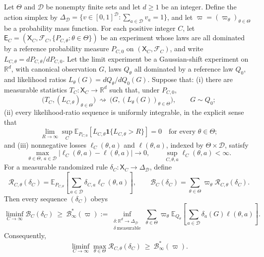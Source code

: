 Let \(\Theta\) and \(\mathcal D\) be nonempty finite sets and let \(d\geq1\) be an integer.  Define the action simplex by \(\Delta_{\mathcal D}=\{v\in[0,1]^{\mathcal D}:\sum_{a\in\mathcal D}v_a=1\}\), and let \(\varpi=(\varpi_\theta)_{\theta\in\Theta}\) be a probability mass function.  For each positive integer \(C\), let \(\mathsf E_C=(\mathsf X_C,\mathcal F_C,\{P_{C,\theta}:\theta\in\Theta\})\) be an experiment whose laws are all dominated by a reference probability measure \(P_{C,0}\) on \((\mathsf X_C,\mathcal F_C)\), and write \(L_{C,\theta}=dP_{C,\theta}/dP_{C,0}\).  Let the limit experiment be a Gaussian-shift experiment on \(\mathbb R^d\), with canonical observation \(G\), laws \(Q_\theta\) all dominated by a reference law \(Q_0\), and likelihood ratios \(L_\theta(G)=dQ_\theta/dQ_0(G)\).  Suppose that: (i) there are measurable statistics \(T_C\colon\mathsf X_C\to\mathbb R^d\) such that, under \(P_{C,0}\),
\[
 \bigl(T_C,(L_{C,\theta})_{\theta\in\Theta}\bigr)
 \ \rightsquigarrow\ 
 \bigl(G,(L_\theta(G))_{\theta\in\Theta}\bigr),
 \qquad G\sim Q_0;
\]
(ii) every likelihood-ratio sequence is uniformly integrable, in the explicit sense that
\[
 \lim_{R\to\infty}\sup_C
 \mathbb E_{P_{C,0}}\!\left[L_{C,\theta}
 \mathbf 1\{L_{C,\theta}>R\}\right]=0
 \quad\text{for every }\theta\in\Theta;
\]
and (iii) nonnegative losses \(\ell_C(\theta,a)\) and \(\ell(\theta,a)\), indexed by \(\Theta\times\mathcal D\), satisfy
\[
 \max_{\theta\in\Theta,\ a\in\mathcal D}
 |\ell_C(\theta,a)-\ell(\theta,a)|\longrightarrow0,
 \qquad
 \sup_{C,\theta,a}\ell_C(\theta,a)<\infty.
\]
For a measurable randomized rule \(\delta_C\colon\mathsf X_C\to\Delta_{\mathcal D}\), define
\[
 \mathcal R_{C,\theta}(\delta_C)
 =\mathbb E_{P_{C,\theta}}\!\left[
   \sum_{a\in\mathcal D}\delta_{C,a}\ell_C(\theta,a)
 \right],
 \qquad
 \mathcal B_C(\delta_C)=\sum_{\theta\in\Theta}\varpi_\theta
 \mathcal R_{C,\theta}(\delta_C).
\]
Then every sequence \((\delta_C)\) obeys
\[
 \liminf_{C\to\infty}\mathcal B_C(\delta_C)
 \ \geq\ 
 \mathcal B_\infty^*(\varpi)
 :=\inf_{\substack{\delta\colon\mathbb R^d\to\Delta_{\mathcal D}\\
                    \delta\ \mathrm{measurable}}}
 \sum_{\theta\in\Theta}\varpi_\theta
 \mathbb E_{Q_\theta}\!\left[
   \sum_{a\in\mathcal D}\delta_a(G)\ell(\theta,a)
 \right].
\]
Consequently,
\[
 \liminf_{C\to\infty}\max_{\theta\in\Theta}
 \mathcal R_{C,\theta}(\delta_C)
 \ \geq\ \mathcal B_\infty^*(\varpi).
\]